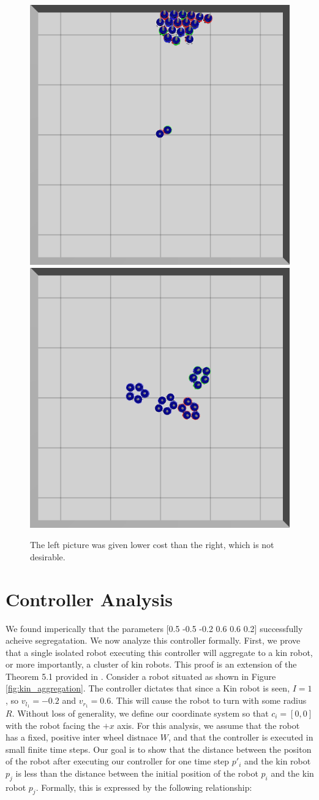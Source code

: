 \documentclass[conference]{IEEEtran}
\begin{document}
  \begin{figure}
    \centering
    \includegraphics[width=0.49\linewidth]{./images/individual_0_gen_0.png}
    \includegraphics[width=0.49\linewidth]{./images/individual_0_gen_1_better.png}
    \caption{The left picture was given lower cost than the right, which is not desirable.}
    \label{fig:cost_function_fuckup}
  \end{figure}



\section{Controller Analysis}

  We found imperically that the parameters [0.5 -0.5 -0.2 0.6 0.6 0.2] successfully acheive segregatation. We now analyze this controller formally. First, we prove that a single isolated robot executing this controller will aggregate to a kin robot, or more importantly, a cluster of kin robots. This proof is an extension of the Theorem 5.1 provided in \cite{gauci_self-organized_2014}. Consider a robot situated as shown in Figure \ref{fig:kin_aggregation}. The controller dictates that since a Kin robot is seen, $I=1$, so $v_{l_1} = -0.2$ and $v_{r_1} = 0.6$. This will cause the robot to turn with some radius $R$. Without loss of generality, we define our coordinate system so that $c_i=[0,0]$ with the robot facing the $+x$ axis. For this analysis, we assume that the robot has a fixed, positive inter wheel distnace $W$, and that the controller is executed in small finite time steps. Our goal is to show that the distance between the positon of the robot after executing our controller for one time step $p'_i$ and the kin robot $p_j$ is less than the distance between the initial position of the robot $p_i$ and the kin robot $p_j$. Formally, this is expressed by the following relationship:
\end{document}
